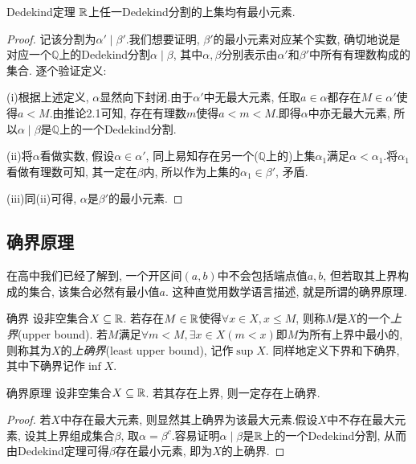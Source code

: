 \begin{theorem}{Dedekind定理}
	$\mathbb{R}$上任一Dedekind分割的上集均有最小元素.
\end{theorem}
\begin{proof}
	记该分割为$\alpha ' \mid \beta '$.我们想要证明, $\beta '$的最小元素对应某个实数, 确切地说是对应一个$\mathbb{Q}$上的Dedekind分割$\alpha \mid \beta$, 其中$\alpha , \beta$分别表示由$\alpha '$和$\beta '$中所有有理数构成的集合. 逐个验证定义: 
	
	(i)根据上述定义, $\alpha$显然向下封闭.由于$\alpha '$中无最大元素, 任取$a \in \alpha$都存在$M \in \alpha '$使得$a < M$.由推论2.1可知, 存在有理数$m$使得$a<m<M$.即得$\alpha$中亦无最大元素, 所以$\alpha \mid \beta$是$\mathbb{Q}$上的一个Dedekind分割. 
	
	(ii)将$\alpha$看做实数, 假设$\alpha \in \alpha '$, 同上易知存在另一个($\mathbb{Q}$上的)上集$\alpha _1$满足$\alpha < \alpha _1$.将$\alpha _1$看做有理数可知, 其一定在$\beta$内, 所以作为上集的$\alpha _1 \in \beta '$, 矛盾. 
	
	(iii)同(ii)可得, $\alpha$是$\beta '$的最小元素.
\end{proof}

\subsection{确界原理}

在高中我们已经了解到, 一个开区间$(a, b)$中不会包括端点值$a, b$, 但若取其上界构成的集合, 该集合必然有最小值$a$. 这种直觉用数学语言描述, 就是所谓的确界原理. 

\begin{definition}{确界}
	设非空集合$X \subseteq \mathbb{R}$. 若存在$M \in \mathbb{R}$使得$\forall x \in X, x \leq M$, 则称$M$是$X$的一个\textit{上界}(upper bound). 若$M$满足$\forall m<M, \exists x \in X (m<x)$即$M$为所有上界中最小的, 则称其为$X$的\textit{上确界}(least upper bound), 记作$\sup X$. 同样地定义下界和下确界, 其中下确界记作$\inf X$.
\end{definition}

\begin{theorem}{确界原理}
	设非空集合$X \subseteq \mathbb{R}$. 若其存在上界, 则一定存在上确界.
\end{theorem}
\begin{proof}
	若$X$中存在最大元素, 则显然其上确界为该最大元素.假设$X$中不存在最大元素, 设其上界组成集合$\beta$, 取$\alpha = \beta ^c$.容易证明$\alpha \mid \beta$是$\mathbb{R}$上的一个Dedekind分割, 从而由Dedekind定理可得$\beta$存在最小元素, 即为$X$的上确界.
\end{proof}

